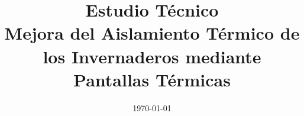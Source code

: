 \title{Estudio Técnico\\ \textbf{Mejora del Aislamiento Térmico de los Invernaderos mediante Pantallas Térmicas}}
\newcommand{\resumen}{ 
}

\documentclass[conference,12pt]{IEEEtran}
\usepackage[pdftex,pdfencoding=auto]{hyperref}
\usepackage[utf8]{inputenc} %
\usepackage{amsmath} %
\usepackage{lipsum} %
\usepackage{tikz} %
\usepackage{float}
\usepackage{ragged2e} %
\usepackage[T1]{fontenc}    %
\usepackage{colortbl} %
\usepackage{pgfplots}
\usepackage[spanish]{babel} %
\usepackage{caption}
\usepackage{pgffor}  %
\usepackage{fancyhdr} %
\setlength{\spaceskip}{4.8pt}
\renewcommand{\thesection}{\arabic{section}} %
\renewcommand{\thesubsection}{\thesection.\arabic{subsection}} %
\renewcommand{\thesubsubsection}{\thesubsection.\arabic{subsubsection}} %
\let\OldTextField\TextField
\renewcommand{\TextField}[2][]{%
  \raisebox{-0.3ex}{\OldTextField[height=.85em,  bordercolor={1 1 1}, backgroundcolor={1 1 1},#1]{#2}}%
}
\renewcommand{\baselinestretch}{1.5}  %
\renewcommand{\rmdefault}{phv}  %
\fontsize{12}{15}\selectfont  %
\onecolumn
\pagestyle{fancy}
\fancyhf{} %
\fancyfoot[C]{\thepage} %
\renewcommand{\headrulewidth}{0pt} %
\renewcommand{\footrulewidth}{0pt} %
\author{\TextField[name=Proyecto,width=16cm]{}}
\date{\today}


